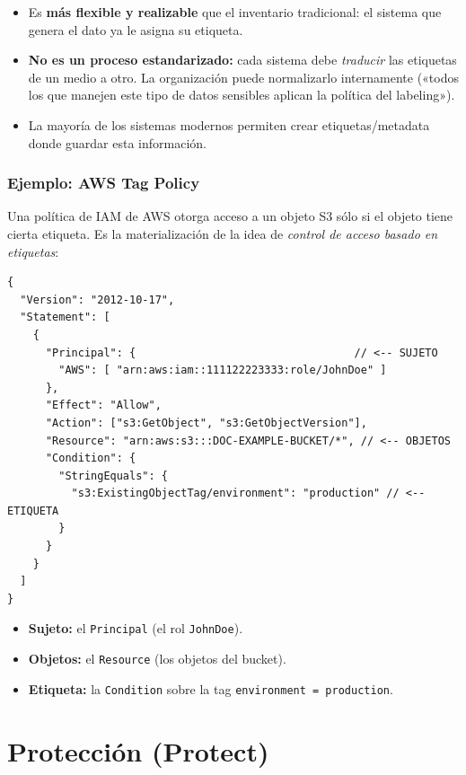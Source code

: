 \documentclass[11pt,a4paper]{article}
\begin{document}
\begin{itemize}[leftmargin=1.4em,itemsep=2pt]
  \item Es \textbf{más flexible y realizable} que el inventario tradicional: el sistema que
        genera el dato ya le asigna su etiqueta.
  \item \textbf{No es un proceso estandarizado:} cada sistema debe \emph{traducir} las
        etiquetas de un medio a otro. La organización puede normalizarlo internamente («todos
        los que manejen este tipo de datos sensibles aplican la política del labeling»).
  \item La mayoría de los sistemas modernos permiten crear etiquetas/metadata donde guardar
        esta información.
\end{itemize}

\subsubsection*{Ejemplo: AWS Tag Policy}

Una política de IAM de AWS otorga acceso a un objeto S3 sólo si el objeto tiene cierta
etiqueta. Es la materialización de la idea de \emph{control de acceso basado en etiquetas}:

\begin{lstlisting}[style=json]
{
  "Version": "2012-10-17",
  "Statement": [
    {
      "Principal": {                                  // <-- SUJETO
        "AWS": [ "arn:aws:iam::111122223333:role/JohnDoe" ]
      },
      "Effect": "Allow",
      "Action": ["s3:GetObject", "s3:GetObjectVersion"],
      "Resource": "arn:aws:s3:::DOC-EXAMPLE-BUCKET/*", // <-- OBJETOS
      "Condition": {
        "StringEquals": {
          "s3:ExistingObjectTag/environment": "production" // <-- ETIQUETA
        }
      }
    }
  ]
}
\end{lstlisting}

\begin{itemize}[leftmargin=1.4em,itemsep=1pt]
  \item \textbf{Sujeto:} el \texttt{Principal} (el rol \texttt{JohnDoe}).
  \item \textbf{Objetos:} el \texttt{Resource} (los objetos del bucket).
  \item \textbf{Etiqueta:} la \texttt{Condition} sobre la tag \texttt{environment = production}.
\end{itemize}

\section{Protección (Protect)}
\end{document}
